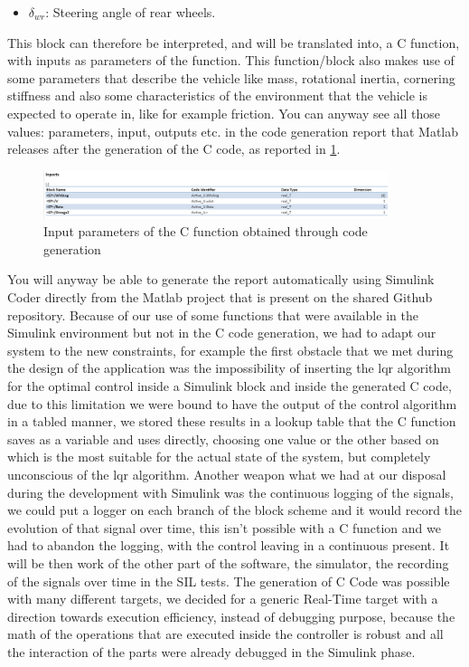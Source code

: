 \begin{itemize}
\item $\delta_{wr}$: Steering angle of rear wheels.
\end{itemize}
This block can therefore be interpreted, and will be translated into, a C function, with inputs as parameters of the function. This function/block also makes use of some parameters that describe the vehicle like mass, rotational inertia, cornering stiffness and also some characteristics of the environment that the vehicle is expected to operate in, like for example friction. You can anyway see all those values: parameters, input, outputs etc. in the code generation report that Matlab releases after the generation of the C code, as reported in \ref{Codegen Inports}. 
\begin{figure} \label{Codegen Inports}
		\centering
		\includegraphics[width=0.9\textwidth]{Images/Simulator/codegen-inports}
		\caption{Input parameters of the C function obtained through code generation}	
\end{figure}
You will anyway be able to generate the report automatically using Simulink Coder directly from the Matlab project that is present on the shared Github repository. Because of our use of some functions that were available in the Simulink environment but not in the C code generation, we had to adapt our system to the new constraints, for example the first obstacle that we met during the design of the application was the impossibility of inserting the lqr algorithm for the optimal control inside a Simulink block and inside the generated C code, due to this limitation we were bound to have the output of the control algorithm in a tabled manner, we stored these results in a lookup table that the C function saves as a variable and uses directly, choosing one value or the other based on which is the most suitable for the actual state of the system, but completely unconscious of the lqr algorithm. Another weapon what we had at our disposal during the development with Simulink was the continuous logging of the signals, we could put a logger on each branch of the block scheme and it would record the evolution of that signal over time, this isn't possible with a C function and we had to abandon the logging, with the control leaving in a continuous present. It will be then work of the other part of the software, the simulator, the recording of the signals over time in the SIL tests. The generation of C Code was possible with many different targets, we decided for  a generic Real-Time target with a direction towards execution efficiency, instead of debugging purpose, because the math of the operations that are executed inside the controller is robust and all the interaction of the parts were already debugged in the Simulink phase.
